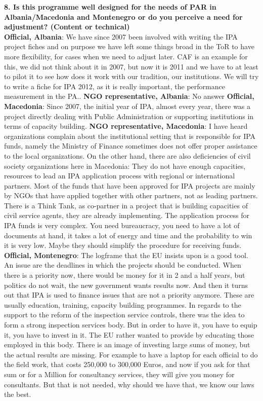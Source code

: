 \textbf{8. Is this programme well designed for the needs of PAR in Albania/Macedonia and Montenegro or do you perceive a need for adjustment? (Content or technical)}\\
\textbf{Official, Albania}: We have since 2007 been involved with writing the IPA project fiches and on purpose we have left some things broad in the ToR to have more flexibility, for cases when we need to adjust later. CAF is an example for this, we did not think about it in 2007, but now it is 2011 and we have to at least to pilot it to see how does it work with our tradition, our institutions. We will try to write a fiche for IPA 2012, as it is really important, the performance measurement in the PA..
\textbf{NGO representative, Albania}: No answer
\textbf{Official, Macedonia}: Since 2007, the initial year of IPA, almost every year, there was a project directly dealing with Public Administration or supporting institutions in terms of capacity building.
\textbf{NGO representative, Macedonia}: I have heard organizations complain about the institutional setting that is responsible for IPA funds, namely the Ministry of Finance sometimes does not offer proper assistance to the local organizations. On the other hand, there are also deficiencies of civil society organizations here in Macedonia: They do not have enough capacities, resources to lead an IPA application process with regional or international partners. Most of the funds that have been approved for IPA projects are mainly by NGOs that have applied together with other partners, not as leading partners. There is a Think Tank, as co-partner in a project that is building capacities of civil service agents, they are already implementing. The application process for IPA funds is very complex. You need bureaucracy, you need to have a lot of documents at hand, it takes a lot of energy and time and the probability to win it is very low. Maybe they should simplify the procedure for receiving funds.
\textbf{Official, Montenegro}: The logframe that the EU insists upon is a good tool. An issue are the deadlines in which the projects should be conducted. When there is a priority now, there would be money for it in 2 and a half years, but politics do not wait, the new government wants results now. And then it turns out that IPA is used to finance issues that are not a priority anymore. These are usually education, training, capacity building programmes. In regards to the support to the reform of the inspection service controls, there was the idea to form a strong inspection services body. But in order to have it, you have to equip it, you have to invest in it. The EU rather wanted to provide by educating those employed in this body. There is an image of investing large sums of money, but the actual results are missing. For example to have a laptop for each official to do the field work, that costs 250,000 to 300,000 Euros, and now if you ask for that sum or for a Million for consultancy services, they will give you money for consultants. But that is not needed, why should we have that, we know our laws the best.
